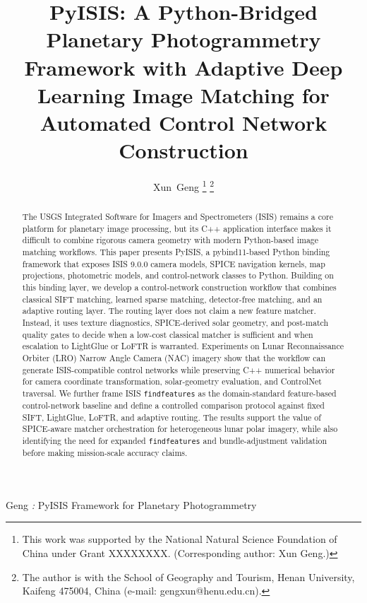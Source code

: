 \documentclass[lettersize,journal]{IEEEtran}
\newcommand{\pyisis}{PyISIS}
\begin{document}
\title{PyISIS: A Python-Bridged Planetary Photogrammetry Framework with Adaptive Deep Learning Image Matching for Automated Control Network Construction}

\author{Xun~Geng%
\thanks{This work was supported by the National Natural Science Foundation of China under Grant XXXXXXXX. (Corresponding author: Xun Geng.)}%
\thanks{The author is with the School of Geography and Tourism, Henan University, Kaifeng 475004, China (e-mail: gengxun@henu.edu.cn).}
}

%
{Geng \MakeLowercase{\textit{\huge:}} PyISIS Framework for Planetary Photogrammetry}


\maketitle

\begin{abstract}
The USGS Integrated Software for Imagers and Spectrometers (ISIS) remains a core platform for planetary image processing, but its C++ application interface makes it difficult to combine rigorous camera geometry with modern Python-based image matching workflows. This paper presents \pyisis{}, a pybind11-based Python binding framework that exposes ISIS 9.0.0 camera models, SPICE navigation kernels, map projections, photometric models, and control-network classes to Python. Building on this binding layer, we develop a control-network construction workflow that combines classical SIFT matching, learned sparse matching, detector-free matching, and an adaptive routing layer. The routing layer does not claim a new feature matcher. Instead, it uses texture diagnostics, SPICE-derived solar geometry, and post-match quality gates to decide when a low-cost classical matcher is sufficient and when escalation to LightGlue or LoFTR is warranted. Experiments on Lunar Reconnaissance Orbiter (LRO) Narrow Angle Camera (NAC) imagery show that the workflow can generate ISIS-compatible control networks while preserving C++ numerical behavior for camera coordinate transformation, solar-geometry evaluation, and ControlNet traversal. We further frame ISIS \texttt{findfeatures} as the domain-standard feature-based control-network baseline and define a controlled comparison protocol against fixed SIFT, LightGlue, LoFTR, and adaptive routing. The results support the value of SPICE-aware matcher orchestration for heterogeneous lunar polar imagery, while also identifying the need for expanded \texttt{findfeatures} and bundle-adjustment validation before making mission-scale accuracy claims.
\end{abstract}
\end{document}

